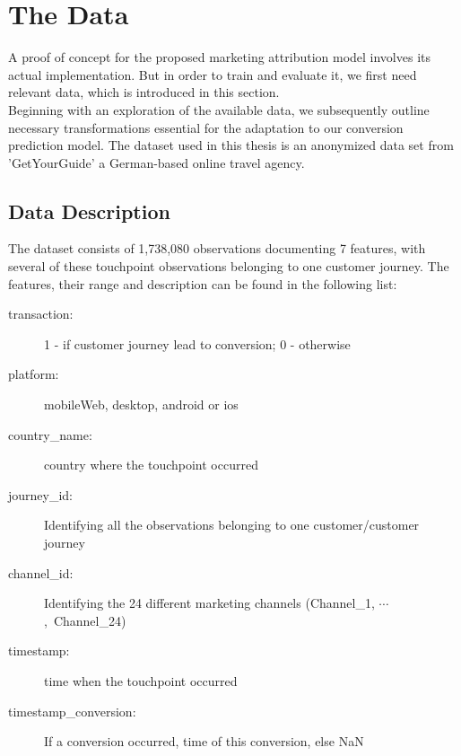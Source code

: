 \chapter{The Data}
A proof of concept for the proposed marketing attribution model involves its actual implementation. But in order to train and evaluate it, we first need relevant data, which is introduced in this section.\\
Beginning with an exploration of the available data, we subsequently outline necessary transformations essential for the adaptation to our conversion prediction model. 
The dataset used in this thesis is an anonymized data set from 'GetYourGuide' a German-based online travel agency. 

\section{Data Description}

The dataset consists of 1,738,080  observations documenting 7 features, with several of these touchpoint observations belonging to one customer journey.
The features, their range and description can be found in the following list:
\begin{description}
    \item[transaction:] 1 - if customer journey lead to conversion; 0 - otherwise
    \item[platform:] mobileWeb, desktop, android or ios
    \item[country\_name:] country where the touchpoint occurred    
    \item[journey\_id:] Identifying all the observations belonging to one customer/customer journey
    \item[channel\_id:] Identifying the 24 different marketing channels (Channel\_1, $\cdots$,\ Channel\_24)
    \item[timestamp:] time when the touchpoint occurred
    \item[timestamp\_conversion:] If a conversion occurred, time of this conversion, else NaN
\end{description}

